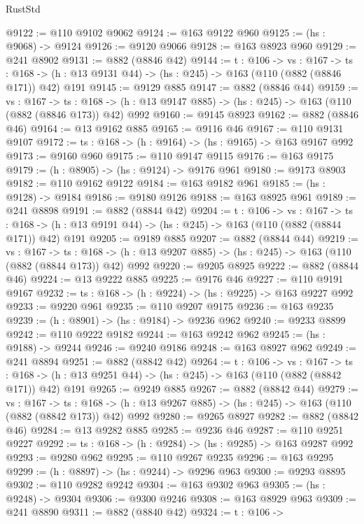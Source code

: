 \begin{lexlean}{RustStd}
\begin{coremodule}
@9122 := @110 @9102 @9062
@9124 := @163 @9122 @960
@9125 := (hs : @9068) -> @9124
@9126 := @9120 @9066
@9128 := @163 @8923 @960
@9129 := @241 @8902
@9131 := @882 (@8846 @42)
@9144 := {t : @106} ->
  {vs : @167} ->
  {ts : @168} -> (h : @13 @9131 @44) -> (hs : @245) -> @163 (@110 (@882 (@8846 @171)) @42) @191
@9145 := @9129 @885
@9147 := @882 (@8846 @44)
@9159 := {vs : @167} ->
  {ts : @168} -> (h : @13 @9147 @885) -> (hs : @245) -> @163 (@110 (@882 (@8846 @173)) @42) @992
@9160 := @9145 @8923
@9162 := @882 (@8846 @46)
@9164 := @13 @9162 @885
@9165 := @9116 @46
@9167 := @110 @9131 @9107
@9172 := {ts : @168} -> (h : @9164) -> (hs : @9165) -> @163 @9167 @992
@9173 := @9160 @960
@9175 := @110 @9147 @9115
@9176 := @163 @9175
@9179 := (h : @8905) -> (hs : @9124) -> @9176 @961
@9180 := @9173 @8903
@9182 := @110 @9162 @9122
@9184 := @163 @9182 @961
@9185 := (hs : @9128) -> @9184
@9186 := @9180 @9126
@9188 := @163 @8925 @961
@9189 := @241 @8898
@9191 := @882 (@8844 @42)
@9204 := {t : @106} ->
  {vs : @167} ->
  {ts : @168} -> (h : @13 @9191 @44) -> (hs : @245) -> @163 (@110 (@882 (@8844 @171)) @42) @191
@9205 := @9189 @885
@9207 := @882 (@8844 @44)
@9219 := {vs : @167} ->
  {ts : @168} -> (h : @13 @9207 @885) -> (hs : @245) -> @163 (@110 (@882 (@8844 @173)) @42) @992
@9220 := @9205 @8925
@9222 := @882 (@8844 @46)
@9224 := @13 @9222 @885
@9225 := @9176 @46
@9227 := @110 @9191 @9167
@9232 := {ts : @168} -> (h : @9224) -> (hs : @9225) -> @163 @9227 @992
@9233 := @9220 @961
@9235 := @110 @9207 @9175
@9236 := @163 @9235
@9239 := (h : @8901) -> (hs : @9184) -> @9236 @962
@9240 := @9233 @8899
@9242 := @110 @9222 @9182
@9244 := @163 @9242 @962
@9245 := (hs : @9188) -> @9244
@9246 := @9240 @9186
@9248 := @163 @8927 @962
@9249 := @241 @8894
@9251 := @882 (@8842 @42)
@9264 := {t : @106} ->
  {vs : @167} ->
  {ts : @168} -> (h : @13 @9251 @44) -> (hs : @245) -> @163 (@110 (@882 (@8842 @171)) @42) @191
@9265 := @9249 @885
@9267 := @882 (@8842 @44)
@9279 := {vs : @167} ->
  {ts : @168} -> (h : @13 @9267 @885) -> (hs : @245) -> @163 (@110 (@882 (@8842 @173)) @42) @992
@9280 := @9265 @8927
@9282 := @882 (@8842 @46)
@9284 := @13 @9282 @885
@9285 := @9236 @46
@9287 := @110 @9251 @9227
@9292 := {ts : @168} -> (h : @9284) -> (hs : @9285) -> @163 @9287 @992
@9293 := @9280 @962
@9295 := @110 @9267 @9235
@9296 := @163 @9295
@9299 := (h : @8897) -> (hs : @9244) -> @9296 @963
@9300 := @9293 @8895
@9302 := @110 @9282 @9242
@9304 := @163 @9302 @963
@9305 := (hs : @9248) -> @9304
@9306 := @9300 @9246
@9308 := @163 @8929 @963
@9309 := @241 @8890
@9311 := @882 (@8840 @42)
@9324 := {t : @106} ->

\end{coremodule}
\end{lexlean}
